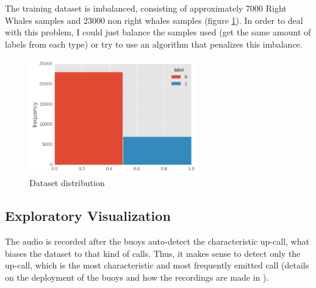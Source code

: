 \documentclass[]{article}
\begin{document}
The training dataset is imbalanced, consisting of approximately 7000 Right Whales samples and 23000 non right whales samples (figure \ref{img:train_dataset}). In order to deal with this problem, I could just balance the samples used (get the same amount of labels from each type) or try to use an algorithm that penalizes this imbalance.

\begin{figure}[htpb!]
\centering
\includegraphics[width= 0.65\textwidth]{./images/2_dataset}
\caption{Dataset distribution \label{img:train_dataset}}
\end{figure}


\subsection{Exploratory Visualization}\label{exploratory-visualization}

The audio is recorded after the buoys auto-detect the characteristic up-call, what biases the dataset to that kind of calls. Thus, it makes sense to detect only the up-call, which is the most characteristic and most frequently emitted call (details on the deployment of the buoys and how the recordings are made in \cite{McDonald2002}). 
\end{document}
